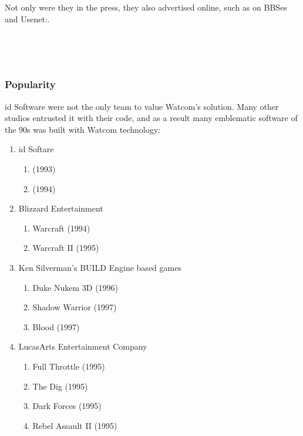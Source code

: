 \vspace{-4mm}
Not only were they in the press, they also advertised online, such as on BBSes and Usenet:.\\
\par
{}\\
\par
{}\\


\subsubsection{Popularity}
id Software were not the only team to value Watcom's solution. Many other studios entrusted it with their code, and as a result many emblematic software of the 90s was built with Watcom technology:\\
\begin{enumerate}
\item id Softare 
       \begin{enumerate}
       \item \doom{} (1993)
       \item \doomii{} (1994)
       \end{enumerate} 
\item Blizzard Entertainment 
       \begin{enumerate}
       \item Warcraft (1994)
       \item Warcraft II (1995)
       \end{enumerate}
\item Ken Silverman's BUILD Engine based games
      \begin{enumerate}
       \item Duke Nukem 3D (1996)
       \item Shadow Warrior (1997)
       \item Blood (1997)
       \end{enumerate}
\item LucasArts Entertainment Company
      \begin{enumerate}
       \item Full Throttle (1995)
       \item The Dig (1995)
       \item Dark Forces  (1995)
       \item Rebel Assault II  (1995)    
      \end{enumerate}
\end{enumerate}
\par


